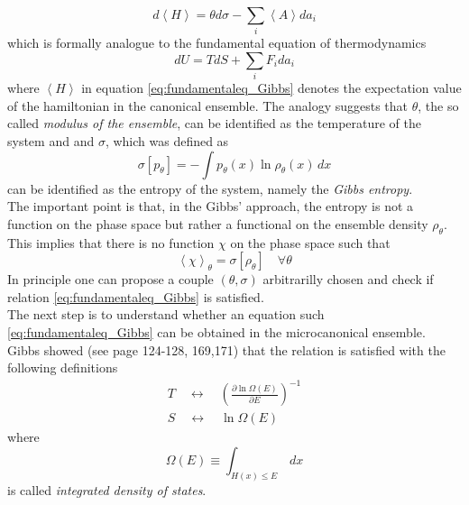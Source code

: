 \begin{equation}
    d\left\langle H \right\rangle = \theta d\sigma - \sum_i \left\langle A \right\rangle da_i
    \label{eq:fundamentaleq_Gibbs}
\end{equation}
which is formally analogue to the fundamental equation of thermodynamics
\begin{equation*}
    dU = TdS + \sum_i F_i da_i
\end{equation*}
where $\left\langle H \right\rangle$ in equation \ref{eq:fundamentaleq_Gibbs} denotes the expectation value of the hamiltonian in the canonical ensemble.
The analogy suggests that $\theta$, the so called \emph{modulus of the ensemble}, can be identified as the temperature of the system and  and $\sigma$, which was defined as
\begin{equation*}
    \sigma[p_{\theta}] = - \int p_{\theta}(x) \ln \rho_{\theta}(x) \, dx
\end{equation*}
can be identified as the entropy of the system, namely the \emph{Gibbs entropy}. \\
The important point is that, in the Gibbs' approach, the entropy is not a function on the phase space but rather a functional on the ensemble density $\rho_{\theta}$. This implies that there is no function $\chi$ on the phase space such that 
\begin{equation*}
    \left\langle \chi \right\rangle_{\theta} = \sigma[\rho_{\theta}] \quad \forall \theta
\end{equation*}
In principle one can propose a couple $(\theta, \sigma)$ arbitrarilly chosen and check if relation \ref{eq:fundamentaleq_Gibbs} is satisfied. \\
The next step is to understand whether an equation such \ref{eq:fundamentaleq_Gibbs} can be obtained in the microcanonical ensemble. Gibbs showed (see \cite{gibbs_2010} page 124-128, 169,171) that the relation is satisfied with the following definitions
\begin{gather*}
    T \quad \longleftrightarrow \quad \left(\frac{\partial \ln \Omega(E)}{\partial E}\right)^{-1} \\
    S \quad \longleftrightarrow \quad \ln \Omega(E)
\end{gather*}
where 
\begin{equation}
    \Omega(E) \equiv \int_{H(x) \leq E} \, dx
    \label{eq:Omega_E}
\end{equation}
is called \emph{integrated density of states}. 

